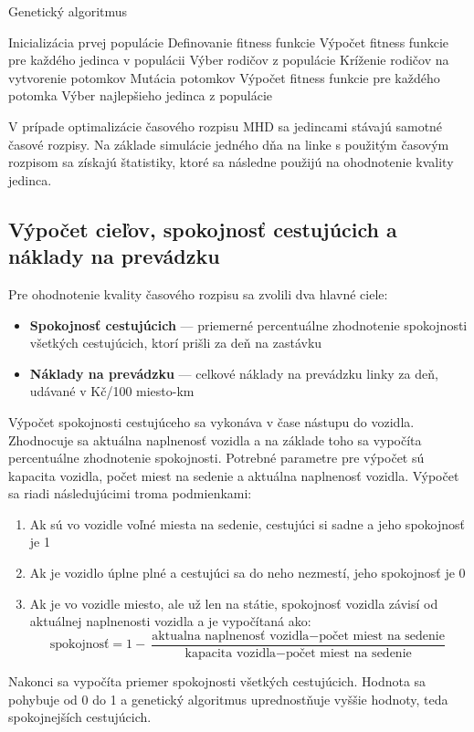 \vspace*{\dimexpr 0.5\baselineskip\relax}
\begin{algorithm}[H]
\label{algoritmus_geneticky_algoritmus}
\caption{Genetický algoritmus}
  Inicializácia prvej populácie\;
  Definovanie fitness funkcie\;
  Výpočet fitness funkcie pre každého jedinca v populácii\;
   {
    Výber rodičov z populácie\;
    Kríženie rodičov na vytvorenie potomkov\;
    Mutácia potomkov\;
    Výpočet fitness funkcie pre každého potomka\;
  }
  Výber najlepšieho jedinca z populácie\;
\end{algorithm}

V prípade optimalizácie časového rozpisu MHD sa jedincami stávajú samotné časové rozpisy.
Na základe simulácie jedného dňa na linke s použitým časovým rozpisom sa získajú štatistiky, ktoré sa následne použijú na ohodnotenie kvality jedinca.

\subsection*{Výpočet cieľov, spokojnosť cestujúcich a náklady na prevádzku}
Pre ohodnotenie kvality časového rozpisu sa zvolili dva hlavné ciele:
\begin{itemize}
  \item \textbf{Spokojnosť cestujúcich} --- priemerné percentuálne zhodnotenie spokojnosti všetkých cestujúcich, ktorí prišli za deň na zastávku
  \item \textbf{Náklady na prevádzku} --- celkové náklady na prevádzku linky za deň, udávané v Kč/100 miesto-km
\end{itemize}

Výpočet spokojnosti cestujúceho sa vykonáva v čase nástupu do vozidla. Zhodnocuje sa aktuálna naplnenosť vozidla a na základe toho sa vypočíta percentuálne zhodnotenie spokojnosti.
Potrebné parametre pre výpočet sú kapacita vozidla, počet miest na sedenie a aktuálna naplnenosť vozidla.
Výpočet sa riadi následujúcimi troma podmienkami:
\begin{enumerate}
  \item Ak sú vo vozidle voľné miesta na sedenie, cestujúci si sadne a jeho spokojnosť je 1
  \item Ak je vozidlo úplne plné a cestujúci sa do neho nezmestí, jeho spokojnosť je 0
  \item Ak je vo vozidle miesto, ale už len na státie, spokojnosť vozidla závisí od aktuálnej naplnenosti vozidla a je vypočítaná ako: \begin{equation}
      \text{spokojnosť} = 1 - \frac{\text{aktualna naplnenosť vozidla} - \text{počet miest na sedenie}}{\text{kapacita vozidla}  - \text{počet miest na sedenie}}
    \end{equation}
\end{enumerate}
Nakonci sa vypočíta priemer spokojnosti všetkých cestujúcich.
Hodnota sa pohybuje od 0 do 1 a genetický algoritmus uprednostňuje vyššie hodnoty, teda spokojnejších cestujúcich.

